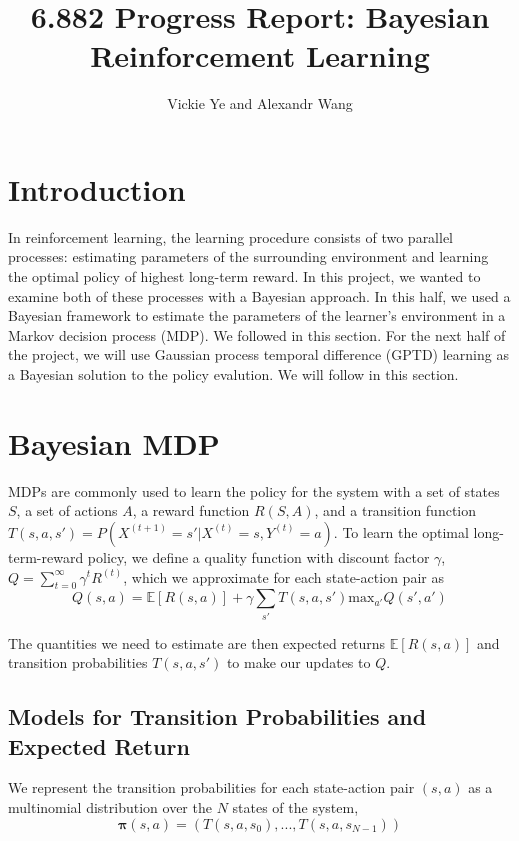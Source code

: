 \documentclass[10pt, twocolumn, twoside]{article}
\title{6.882 Progress Report: Bayesian Reinforcement Learning}
\date{}
\author {Vickie Ye and Alexandr Wang}
\begin{document}
\maketitle

\section{Introduction}
In reinforcement learning, the learning procedure consists of two parallel processes:
estimating parameters of the surrounding environment and learning the optimal policy
of highest long-term reward. In this project, we wanted to examine both of these
processes with a Bayesian approach. In this half, we used a Bayesian framework to
estimate the parameters of the learner's environment in a Markov decision process
(MDP). We followed \cite{strens} in this section. For the next half of
the project, we will use Gaussian process temporal difference (GPTD) learning as a
Bayesian solution to the policy evalution. We will follow \cite{engel} in this
section.

\section{Bayesian MDP}
MDPs are commonly used to learn the policy for the system with a set of states $S$,
a set of actions $A$, a reward function $R(S, A)$, and a transition function
$T(s, a, s') = P(X^{(t+1)} = s' | X^{(t)} = s, Y^{(t)} = a)$. To learn the optimal
long-term-reward policy, we define a quality function with discount factor
$\gamma$, $Q = \sum_{t=0}^\infty \gamma^t R^(t)$, which we approximate for each
state-action pair as
\begin{equation*}
Q(s, a) = \mathbb{E}[R(s,a)]+\gamma\sum_{s'}T(s, a, s')\textrm{max}_{a'} Q(s',a')
\end{equation*}

The quantities we need to estimate are then expected returns $\mathbb{E}[R(s, a)]$
and transition probabilities $T(s, a, s')$ to make our updates to $Q$.

\subsection{Models for Transition Probabilities and Expected Return}
We represent the transition probabilities for each state-action pair $(s, a)$ as
a multinomial distribution over the $N$ states of the system,
\begin{equation*}
\mathbf{\pi}(s, a) = (T(s, a, s_0), ..., T(s, a, s_{N-1}))
\end{equation*}
\end{document}
